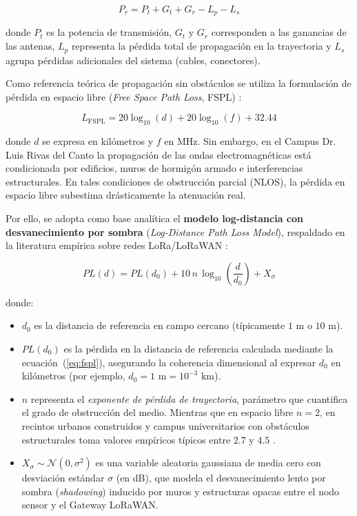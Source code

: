 \documentclass[12pt,oneside,openany,spanish,oldfontcommands]{memoir}
\begin{document}
\begin{equation}
P_r = P_t + G_t + G_r - L_p - L_s
\label{eq:linkbudget}
\end{equation}

donde $P_t$ es la potencia de transmisión, $G_t$ y $G_r$ corresponden a las ganancias de
las antenas, $L_p$ representa la pérdida total de propagación en la trayectoria y $L_s$
agrupa pérdidas adicionales del sistema (cables, conectores).

Como referencia teórica de propagación sin obstáculos se utiliza la formulación de pérdida
en espacio libre (\textit{Free Space Path Loss}, FSPL) \parencite{seybold2005}:

\begin{equation}
L_{\mathrm{FSPL}} = 20\log_{10}(d) + 20\log_{10}(f) + 32.44
\label{eq:fspl}
\end{equation}

donde $d$ se expresa en kilómetros y $f$ en MHz. Sin embargo, en el Campus Dr. Luis Rivas
del Canto la propagación de las ondas electromagnéticas está condicionada por edificios,
muros de hormigón armado e interferencias estructurales. En tales condiciones de obstrucción
parcial (NLOS), la pérdida en espacio libre subestima drásticamente la atenuación real.

Por ello, se adopta como base analítica el \textbf{modelo log-distancia con desvanecimiento
por sombra} (\textit{Log-Distance Path Loss Model}), respaldado en la literatura empírica
sobre redes LoRa/LoRaWAN \parencite{rademacher2021,ahmed2024vegetacion}:

\begin{equation}
PL(d) = PL(d_0) + 10\,n\,\log_{10}\left(\frac{d}{d_0}\right) + X_\sigma
\label{eq:logdistance}
\end{equation}

donde:
\begin{itemize}
  \item $d_0$ es la distancia de referencia en campo cercano (típicamente $1\text{ m}$ o $10\text{ m}$).
  \item $PL(d_0)$ es la pérdida en la distancia de referencia calculada mediante la
  ecuación~(\ref{eq:fspl}), asegurando la coherencia dimensional al expresar $d_0$ en
  kilómetros (por ejemplo, $d_0 = 1\text{ m} = 10^{-3}\text{ km}$).
  \item $n$ representa el \emph{exponente de pérdida de trayectoria}, parámetro que
  cuantifica el grado de obstrucción del medio. Mientras que en espacio libre $n = 2$, en
  recintos urbanos construidos y campus universitarios con obstáculos estructurales toma
  valores empíricos típicos entre $2.7$ y $4.5$ \parencite{rademacher2021}.
  \item $X_\sigma \sim \mathcal{N}(0, \sigma^2)$ es una variable aleatoria gaussiana de
  media cero con desviación estándar $\sigma$ (en dB), que modela el desvanecimiento lento
  por sombra (\emph{shadowing}) inducido por muros y estructuras opacas entre el nodo
  sensor y el Gateway LoRaWAN.
\end{itemize}
\end{document}
